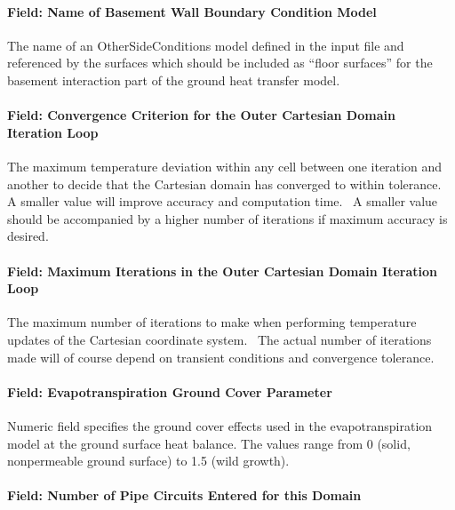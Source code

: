 \paragraph{Field: Name of Basement Wall Boundary Condition Model}\label{field-name-of-basement-wall-boundary-condition-model-1}

The name of an OtherSideConditions model defined in the input file and referenced by the surfaces which should be included as ``floor surfaces'' for the basement interaction part of the ground heat transfer model.

\paragraph{Field: Convergence Criterion for the Outer Cartesian Domain Iteration Loop}\label{field-convergence-criterion-for-the-outer-cartesian-domain-iteration-loop}

The maximum temperature deviation within any cell between one iteration and another to decide that the Cartesian domain has converged to within tolerance.~ A smaller value will improve accuracy and computation time.~ A smaller value should be accompanied by a higher number of iterations if maximum accuracy is desired.

\paragraph{Field: Maximum Iterations in the Outer Cartesian Domain Iteration Loop}\label{field-maximum-iterations-in-the-outer-cartesian-domain-iteration-loop}

The maximum number of iterations to make when performing temperature updates of the Cartesian coordinate system.~ The actual number of iterations made will of course depend on transient conditions and convergence tolerance.

\paragraph{Field: Evapotranspiration Ground Cover Parameter}\label{field-evapotranspiration-ground-cover-parameter-000}

Numeric field specifies the ground cover effects used in the evapotranspiration model at the ground surface heat balance. The values range from 0 (solid, nonpermeable ground surface) to 1.5 (wild growth).

\paragraph{Field: Number of Pipe Circuits Entered for this Domain}\label{field-number-of-pipe-circuits-entered-for-this-domain}

